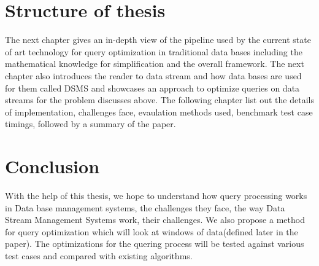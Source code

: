 \section{Structure of thesis}
\label{sec:Structure of thesis}
The next chapter gives an in-depth view of the pipeline used by the current state of art technology for query optimization in traditional data bases including the mathematical knowledge for simplification and the overall framework. The next chapter also introduces the reader to data stream and how data bases are used for them called DSMS and showcases an approach to optimize queries on data streams for the problem discusses above. The following chapter list out the details of implementation, challenges face, evaulation methods used, benchmark test case timings, followed by a summary of the paper.

\section{Conclusion}
\label{sec:Conclusion}
With the help of this thesis, we hope to understand how query processing works in Data base management systems, the challenges they face, the way Data Stream Management Systems work, their challenges. We also propose a method for query optimization which will look at windows of data(defined later in the paper). The optimizations for the quering process will be tested against various test cases and compared with existing algorithms.
